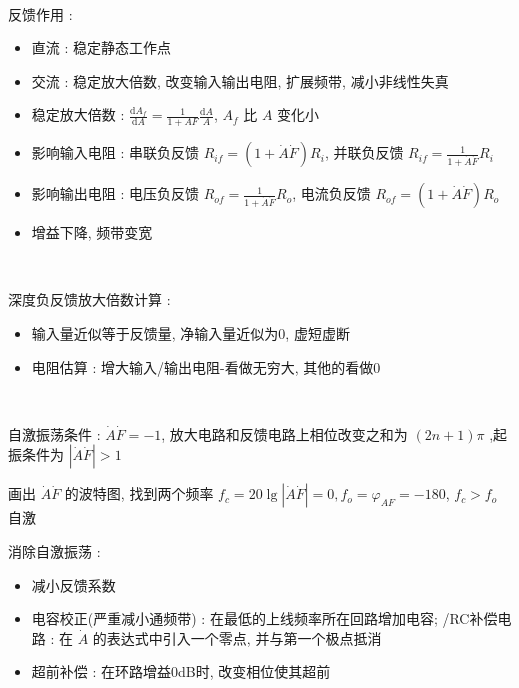 \documentclass[UTF8, 12pt]{ctexart}
\begin{document}
	~

	\noindent
	反馈作用 :
	\begin{itemize}[leftmargin = 4em]
		\item 直流 : 稳定静态工作点
		\item 交流 : 稳定放大倍数, 改变输入输出电阻, 扩展频带, 减小非线性失真
		\item 稳定放大倍数 : $ \frac{\mathrm{d}A_{f}}{\mathrm{d}A} = \frac{1}{1+AF}\frac{\mathrm{d}A}{A} $, $ A_{f} $ 比 $ A $ 变化小
		\item 影响输入电阻 : 串联负反馈 $ R_{if} = (1+\dot{A}\dot{F})R_{i} $, 并联负反馈 $ R_{if} = \frac{1}{1+\dot{A}\dot{F}}R_{i} $
		\item 影响输出电阻 : 电压负反馈 $ R_{of} = \frac{1}{1+\dot{A}\dot{F}}R_{o} $, 电流负反馈 $ R_{of} = (1+\dot{A}\dot{F})R_{o} $
		\item 增益下降, 频带变宽
	\end{itemize}

	~

	\noindent
	深度负反馈放大倍数计算 :
	\begin{itemize}[leftmargin = 4em]
		\item 输入量近似等于反馈量, 净输入量近似为0, 虚短虚断
		\item 电阻估算 : 增大输入/输出电阻-看做无穷大, 其他的看做0
	\end{itemize}

	~

	\noindent
	自激振荡条件 :  $ \dot{A}\dot{F} = -1 $, 放大电路和反馈电路上相位改变之和为 $ (2n+1)\pi $ ,起振条件为 $ |\dot{A}\dot{F}| > 1 $

	画出 $ \dot{A}\dot{F} $ 的波特图, 找到两个频率 $ f_{c} = 20\lg|\dot{A}\dot{F}| = 0, f_{o} = \varphi_{AF} = -180 $, $ f_{c} > f_{o} $ 自激

	消除自激振荡 :
	\begin{itemize}[leftmargin = 4em]
		\item 减小反馈系数
		\item 电容校正(严重减小通频带) : 在最低的上线频率所在回路增加电容; /RC补偿电路 : 在 $ \dot{A} $ 的表达式中引入一个零点, 并与第一个极点抵消
		\item 超前补偿 : 在环路增益0dB时, 改变相位使其超前
	\end{itemize}
\end{document}
